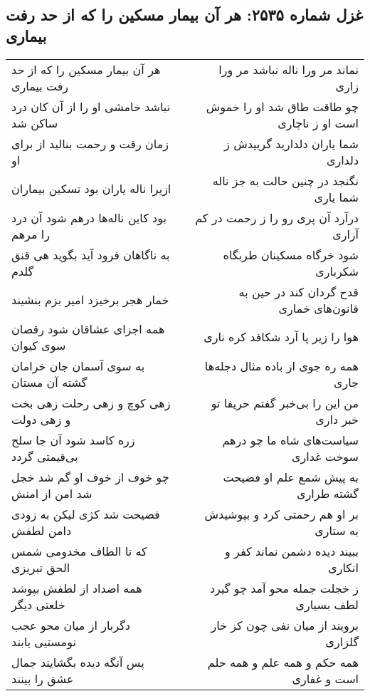\begin{center}
\section*{غزل شماره ۲۵۳۵: هر آن بیمار مسکین را که از حد رفت بیماری}
\label{sec:2535}
\begin{longtable}{l p{0.5cm} r}
هر آن بیمار مسکین را که از حد رفت بیماری
&&
نماند مر ورا ناله نباشد مر ورا زاری
\\
نباشد خامشی او را از آن کان درد ساکن شد
&&
چو طاقت طاق شد او را خموش است او ز ناچاری
\\
زمان رقت و رحمت بنالید از برای او
&&
شما یاران دلدارید گرییدش ز دلداری
\\
ازیرا ناله یاران بود تسکین بیماران
&&
نگنجد در چنین حالت به جز ناله شما یاری
\\
بود کاین ناله‌ها درهم شود آن درد را مرهم
&&
درآرد آن پری رو را ز رحمت در کم آزاری
\\
به ناگاهان فرود آید بگوید هی قنق گلدم
&&
شود خرگاه مسکینان طربگاه شکرباری
\\
خمار هجر برخیزد امیر بزم بنشیند
&&
قدح گردان کند در حین به قانون‌های خماری
\\
همه اجزای عشاقان شود رقصان سوی کیوان
&&
هوا را زیر پا آرد شکافد کره ناری
\\
به سوی آسمان جان خرامان گشته آن مستان
&&
همه ره جوی از باده مثال دجله‌ها جاری
\\
زهی کوچ و زهی رحلت زهی بخت و زهی دولت
&&
من این را بی‌خبر گفتم حریفا تو خبر داری
\\
زره کاسد شود آن جا سلح بی‌قیمتی گردد
&&
سیاست‌های شاه ما چو درهم سوخت غداری
\\
چو خوف از خوف او گم شد خجل شد امن از امنش
&&
به پیش شمع علم او فضیحت گشته طراری
\\
فضیحت شد کژی لیکن به زودی دامن لطفش
&&
بر او هم رحمتی کرد و بپوشیدش به ستاری
\\
که تا الطاف مخدومی شمس الحق تبریزی
&&
ببیند دیده دشمن نماند کفر و انکاری
\\
همه اضداد از لطفش بپوشد خلعتی دیگر
&&
ز خجلت جمله محو آمد چو گیرد لطف بسیاری
\\
دگربار از میان محو عجب نومستیی یابند
&&
برویند از میان نفی چون کز خار گلزاری
\\
پس آنگه دیده بگشایند جمال عشق را بینند
&&
همه حکم و همه علم و همه حلم است و غفاری
\\
\end{longtable}
\end{center}
